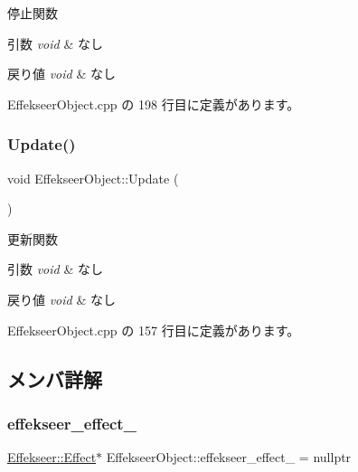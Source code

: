 停止関数 


\begin{DoxyParams}{引数}
{\em void} & なし \\
\hline
\end{DoxyParams}

\begin{DoxyRetVals}{戻り値}
{\em void} & なし \\
\hline
\end{DoxyRetVals}


 Effekseer\+Object.\+cpp の 198 行目に定義があります。

\mbox{\label{class_effekseer_object_aecb9314a5ff922c9420301129d2f26f7}} 
\subsubsection{\texorpdfstring{Update()}{Update()}}
{\footnotesize\ttfamily void Effekseer\+Object\+::\+Update (\begin{DoxyParamCaption}{ }\end{DoxyParamCaption})}



更新関数 


\begin{DoxyParams}{引数}
{\em void} & なし \\
\hline
\end{DoxyParams}

\begin{DoxyRetVals}{戻り値}
{\em void} & なし \\
\hline
\end{DoxyRetVals}


 Effekseer\+Object.\+cpp の 157 行目に定義があります。



\subsection{メンバ詳解}
\mbox{\label{class_effekseer_object_a66c732f526b92301c72070648ca7e70f}} 
\subsubsection{\texorpdfstring{effekseer\+\_\+effect\+\_\+}{effekseer\_effect\_}}
{\footnotesize\ttfamily \mbox{\hyperlink{class_effekseer_1_1_effect}{Effekseer\+::\+Effect}}$\ast$ Effekseer\+Object\+::effekseer\+\_\+effect\+\_\+ = nullptr\hspace{0.3cm}{\ttfamily [private]}}



